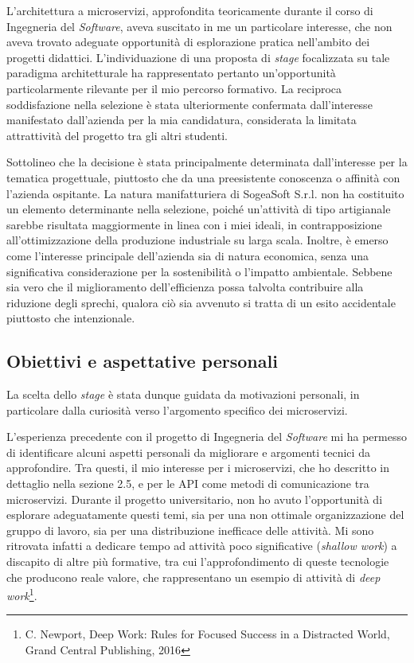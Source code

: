     \vspace{0.2 em}
    \noindent L'architettura a microservizi, approfondita teoricamente durante il corso di Ingegneria del \textit{Software}, aveva suscitato in me un particolare interesse, che non aveva trovato adeguate opportunità di esplorazione pratica nell'ambito dei progetti didattici. L'individuazione di una proposta di \textit{stage} focalizzata su tale paradigma architetturale ha rappresentato pertanto un'opportunità particolarmente rilevante per il mio percorso formativo. La reciproca soddisfazione nella selezione è stata ulteriormente confermata dall'interesse manifestato dall'azienda per la mia candidatura, considerata la limitata attrattività del progetto tra gli altri studenti.

    \vspace{0.2 em}
    \noindent Sottolineo che la decisione è stata principalmente determinata dall'interesse per la tematica progettuale, piuttosto che da una preesistente conoscenza o affinità con l'azienda ospitante. La natura manifatturiera di SogeaSoft S.r.l. non ha costituito un elemento determinante nella selezione, poiché un'attività di tipo artigianale sarebbe risultata maggiormente in linea con i miei ideali, in contrapposizione all'ottimizzazione della produzione industriale su larga scala. Inoltre, è emerso come l'interesse principale dell'azienda sia di natura economica, senza una significativa considerazione per la sostenibilità o l'impatto ambientale. Sebbene sia vero che il miglioramento dell'efficienza possa talvolta contribuire alla riduzione degli sprechi, qualora ciò sia avvenuto si tratta di un esito accidentale piuttosto che intenzionale.

    
        \subsection{Obiettivi e aspettative personali}
        \noindent La scelta dello \textit{stage} è stata dunque guidata da motivazioni personali, in particolare dalla curiosità verso l'argomento specifico dei microservizi.

        \vspace{0.2 em}
        \noindent L'esperienza precedente con il progetto di Ingegneria del \textit{Software} mi ha permesso di identificare alcuni aspetti personali da migliorare e argomenti tecnici da approfondire. Tra questi, il mio interesse per i microservizi, che ho descritto in dettaglio nella sezione 2.5, e per le API come metodi di comunicazione tra microservizi. Durante il progetto universitario, non ho avuto l'opportunità di esplorare adeguatamente questi temi, sia per una non ottimale organizzazione del gruppo di lavoro, sia per una distribuzione inefficace delle attività. Mi sono ritrovata infatti a dedicare tempo ad attività poco significative (\textit{shallow work}) a discapito di altre più formative, tra cui l'approfondimento di queste tecnologie che producono reale valore, che rappresentano un esempio di attività di \textit{deep work}\footnote{C. Newport, Deep Work: Rules for Focused Success in a Distracted World, Grand Central Publishing, 2016}.

